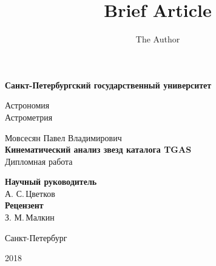 \documentclass[14pt]{article} %
\title{Brief Article}
\author{The Author}
\begin{document}
\begin{titlepage}

\begin{center}
{\small \bf Санкт-Петербургский государственный университет

Астрономия\\Астрометрия}
\end{center}

\vspace{2cm}
\begin{center}
Мовсесян Павел Владимирович\\
  \large{\bf Кинематический анализ звезд каталога TGAS}\\
  Дипломная работа
\end{center}

\vspace{3cm}

\hspace{8cm}\parbox{8cm}{	%

\footnotesize{{\bf Научный руководитель}\\
А. С.\,Цветков} \\  %

{\bf Рецензент}\\
З. М.\,Малкин \\  %
}

\vfill %

\begin{center}
\small {Санкт-Петербург

2018}
\end{center}

\end{titlepage}
\end{document}
